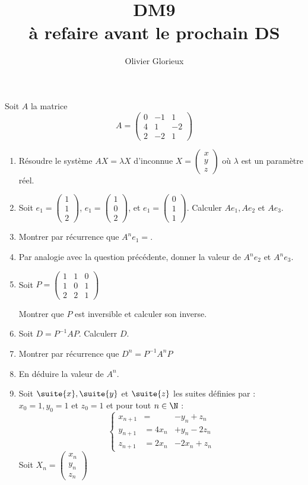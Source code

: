 \documentclass[a4paper, 11pt,reqno]{article}
\author{Olivier Glorieux}
\begin{document}
\title{DM9  \\
\small{à refaire avant le prochain DS } 
}

\begin{exercice}
Soit $A$ la matrice 
$$A=\left(
\begin{array}{ccc}
0&-1&1\\
4&1&-2\\
2&-2&1
\end{array}
 \right)$$
 
 
\begin{enumerate}
\item Résoudre le système $AX=\lambda X$ d'inconnue $X =\left(
\begin{array}{c}
x\\
y\\
z
\end{array}
 \right)$ où $\lambda$ est un paramètre réel. 
 
 \item Soit $e_1= \left(
\begin{array}{c}
1\\
1\\
2
\end{array}
 \right)$,  $e_1= \left(
\begin{array}{c}
1\\
0\\
2
\end{array}
 \right)$, et  $e_1= \left(
\begin{array}{c}
0\\
1\\
1
\end{array}
 \right)$.
 Calculer $Ae_1, Ae_2$ et $Ae_3$. 
 
\item Montrer par récurrence que $A^ne_1= $. 
\item Par analogie avec la question précédente, donner la valeur de $A^n e_2 $ et $A^n e_3$.
\item Soit $P= \left(
\begin{array}{ccc}
1&1&0\\
1&0&1\\
2&2&1
\end{array}
 \right)$ 
 
 Montrer que $P$ est inversible et calculer son inverse. 
 \item Soit $D=P^{-1}AP$. Calculerr $D$. 
 \item Montrer par récurrence que $D^n = P^{-1}A^n P$
 \item En déduire la valeur de $A^n$. 
\item Soit $\suite{x}, \suite{y} $ et $\suite{z}$ les suites définies par : 
$x_0=1, y_0=1 $ et $z_0=1$ et pour tout $n\in \N$ :
$$\left\{
\begin{array}{cll}
x_{n+1} &= &-y_n+z_n\\
y_{n+1}&=4x_n&+y_n-2z_n\\
z_{n+1}&=2x_n&-2x_n+z_n
\end{array}
 \right.$$ 
Soit $X_n = \left(
\begin{array}{c}
x_{n}\\
y_{n}\\
z_{n}
\end{array}
 \right)$
 

\end{enumerate}
\end{exercice}
\end{document}
